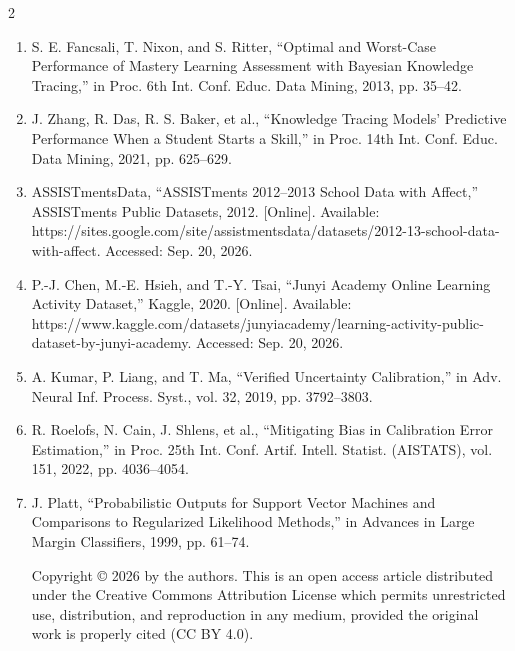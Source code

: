 \documentclass[10pt,a4paper]{article}
\begin{document}
\begin{multicols}{2}
{\begin{enumerate}
\item S. E. Fancsali, T. Nixon, and S. Ritter, ``Optimal and Worst-Case Performance of Mastery Learning Assessment with Bayesian Knowledge Tracing,'' in Proc. 6th Int. Conf. Educ. Data Mining, 2013, pp. 35--42.

\item J. Zhang, R. Das, R. S. Baker, et al., ``Knowledge Tracing Models' Predictive Performance When a Student Starts a Skill,'' in Proc. 14th Int. Conf. Educ. Data Mining, 2021, pp. 625--629.

\item ASSISTmentsData, ``ASSISTments 2012--2013 School Data with Affect,'' ASSISTments Public Datasets, 2012. [Online]. Available: https://sites.google.com/site/assistmentsdata/datasets/2012-13-school-data-with-affect. Accessed: Sep. 20, 2026.

\item P.-J. Chen, M.-E. Hsieh, and T.-Y. Tsai, ``Junyi Academy Online Learning Activity Dataset,'' Kaggle, 2020. [Online]. Available: https://www.kaggle.com/datasets/junyiacademy/learning-activity-public-dataset-by-junyi-academy. Accessed: Sep. 20, 2026.

\item A. Kumar, P. Liang, and T. Ma, ``Verified Uncertainty Calibration,'' in Adv. Neural Inf. Process. Syst., vol. 32, 2019, pp. 3792--3803.

\item R. Roelofs, N. Cain, J. Shlens, et al., ``Mitigating Bias in Calibration Error Estimation,'' in Proc. 25th Int. Conf. Artif. Intell. Statist. (AISTATS), vol. 151, 2022, pp. 4036--4054.

\item J. Platt, ``Probabilistic Outputs for Support Vector Machines and Comparisons to Regularized Likelihood Methods,'' in Advances in Large Margin Classifiers, 1999, pp. 61--74.

Copyright \copyright{} 2026 by the authors. This is an open access article distributed under the Creative Commons Attribution License which permits unrestricted use, distribution, and reproduction in any medium, provided the original work is properly cited (CC BY 4.0).

\end{enumerate}
}

\end{multicols}
\end{document}
